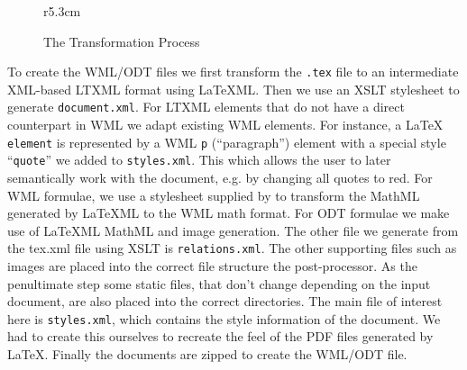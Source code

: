 \documentclass{llncs}
\def\latexml{{\LaTeX}ML\xspace}
\begin{document}
\begin{figure}r{5.3cm}\scriptsize\vspace*{-2em}
\caption{The Transformation Process}\label{fig:arch}\vspace*{-1em}
\end{figure}
To create the WML/ODT files we first transform the \texttt{.tex} file to an intermediate
XML-based \textsf{LTXML} format using \latexml. Then we use an XSLT stylesheet to generate
\texttt{document.xml}. For \textsf{LTXML} elements that do not have a direct counterpart
in WML we adapt existing WML elements. For instance, a {\LaTeX} \texttt{element} is
represented by a WML \texttt{p} (``paragraph'') element with a special style
``\texttt{quote}'' we added to \texttt{styles.xml}. This which allows the user to later
semantically work with the document, e.g. by changing all quotes to red.  For WML
formulae, we use a stylesheet supplied by to transform the MathML generated by \latexml to
the WML math format. For ODT formulae we make use of \latexml MathML and image generation.
The other file we generate from the tex.xml file using XSLT is \texttt{relations.xml}. The
other supporting files such as images are placed into the correct file structure the
post-processor. As the penultimate step some static files, that don't change depending on
the input document, are also placed into the correct directories. The main file of
interest here is \texttt{styles.xml}, which contains the style information of the
document. We had to create this ourselves to recreate the feel of the PDF files generated
by {\LaTeX}. Finally the documents are zipped to create the WML/ODT file.
\end{document}
